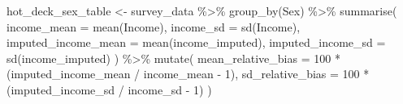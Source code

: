 \documentclass[
  spanish,
  11pt,
  letterpaper,
  oneside,
  open=any]{scrbook}
\newenvironment{Shaded}{\begin{snugshade}}{\end{snugshade}}
\newcommand{\AttributeTok}[1]{\textcolor[rgb]{0.40,0.45,0.13}{#1}}
\newcommand{\DecValTok}[1]{\textcolor[rgb]{0.68,0.00,0.00}{#1}}
\newcommand{\FunctionTok}[1]{\textcolor[rgb]{0.28,0.35,0.67}{#1}}
\newcommand{\NormalTok}[1]{\textcolor[rgb]{0.00,0.23,0.31}{#1}}
\newcommand{\OtherTok}[1]{\textcolor[rgb]{0.00,0.23,0.31}{#1}}
\newcommand{\SpecialCharTok}[1]{\textcolor[rgb]{0.37,0.37,0.37}{#1}}
\begin{document}
\begin{Shaded}
\begin{Highlighting}[]
\NormalTok{hot\_deck\_sex\_table }\OtherTok{\textless{}{-}}\NormalTok{ survey\_data }\SpecialCharTok{\%\textgreater{}\%}
  \FunctionTok{group\_by}\NormalTok{(Sex) }\SpecialCharTok{\%\textgreater{}\%}
  \FunctionTok{summarise}\NormalTok{(}
    \AttributeTok{income\_mean =} \FunctionTok{mean}\NormalTok{(Income),}
    \AttributeTok{income\_sd =} \FunctionTok{sd}\NormalTok{(Income),}
    \AttributeTok{imputed\_income\_mean =} \FunctionTok{mean}\NormalTok{(income\_imputed),}
    \AttributeTok{imputed\_income\_sd =} \FunctionTok{sd}\NormalTok{(income\_imputed)}
\NormalTok{  ) }\SpecialCharTok{\%\textgreater{}\%}
  \FunctionTok{mutate}\NormalTok{(}
    \AttributeTok{mean\_relative\_bias =} \DecValTok{100} \SpecialCharTok{*}\NormalTok{ (imputed\_income\_mean }\SpecialCharTok{/}\NormalTok{ income\_mean }\SpecialCharTok{{-}} \DecValTok{1}\NormalTok{),}
    \AttributeTok{sd\_relative\_bias =} \DecValTok{100} \SpecialCharTok{*}\NormalTok{ (imputed\_income\_sd }\SpecialCharTok{/}\NormalTok{ income\_sd }\SpecialCharTok{{-}} \DecValTok{1}\NormalTok{)}
\NormalTok{  )}
\end{Highlighting}
\end{Shaded}
\end{document}
